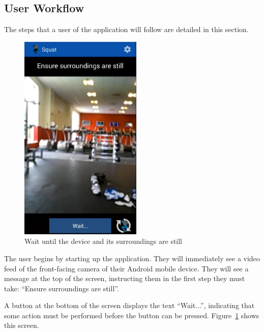 \subsection{User Workflow}

The steps that a user of the application will follow are detailed in this section.

\begin{figure}[H]
    \centering
	\includegraphics[height=10cm]{application/images/ensuresurroundingsstill}
\caption{Wait until the device and its surroundings are still}
\label{fig:ensuresurroundings}
\end{figure}

The user begins by starting up the application. They will immediately see a video feed of the front-facing camera of their Android mobile device. They will see a message at the top of the screen, instructing them in the first step they must take: ``Ensure surroundings are still''.

A button at the bottom of the screen displays the text ``Wait...'', indicating that some action must be performed before the button can be pressed. Figure~\ref{fig:ensuresurroundings} shows this screen.

